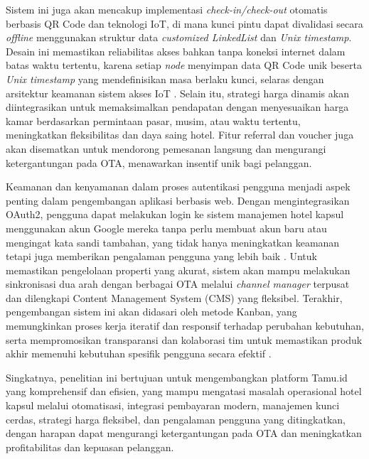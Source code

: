 Sistem ini juga akan mencakup implementasi \textit{check-in/check-out} otomatis berbasis QR Code dan teknologi IoT, di mana kunci pintu dapat divalidasi secara \textit{offline} menggunakan struktur data \textit{customized LinkedList} dan \textit{Unix timestamp}. Desain ini memastikan reliabilitas akses bahkan tanpa koneksi internet dalam batas waktu tertentu, karena setiap \textit{node} menyimpan data QR Code unik beserta \textit{Unix timestamp} yang mendefinisikan masa berlaku kunci, selaras dengan arsitektur keamanan sistem akses IoT \cite{alturjman2021}. Selain itu, strategi harga dinamis akan diintegrasikan untuk memaksimalkan pendapatan dengan menyesuaikan harga kamar berdasarkan permintaan pasar, musim, atau waktu tertentu, meningkatkan fleksibilitas dan daya saing hotel. Fitur referral dan voucher juga akan disematkan untuk mendorong pemesanan langsung dan mengurangi ketergantungan pada OTA, menawarkan insentif unik bagi pelanggan.

Keamanan dan kenyamanan dalam proses autentikasi pengguna menjadi aspek penting dalam pengembangan aplikasi berbasis web. Dengan mengintegrasikan OAuth2, pengguna dapat melakukan login ke sistem manajemen hotel kapsul menggunakan akun Google mereka tanpa perlu membuat akun baru atau mengingat kata sandi tambahan, yang tidak hanya meningkatkan keamanan tetapi juga memberikan pengalaman pengguna yang lebih baik \cite{oauthmic}. Untuk memastikan pengelolaan properti yang akurat, sistem akan mampu melakukan sinkronisasi dua arah dengan berbagai OTA melalui \textit{channel manager} terpusat dan dilengkapi Content Management System (CMS) yang fleksibel. Terakhir, pengembangan sistem ini akan didasari oleh metode Kanban, yang memungkinkan proses kerja iteratif dan responsif terhadap perubahan kebutuhan, serta mempromosikan transparansi dan kolaborasi tim untuk memastikan produk akhir memenuhi kebutuhan spesifik pengguna secara efektif \cite{anderson2010}.

Singkatnya, penelitian ini bertujuan untuk mengembangkan platform Tamu.id yang komprehensif dan efisien, yang mampu mengatasi masalah operasional hotel kapsul melalui otomatisasi, integrasi pembayaran modern, manajemen kunci cerdas, strategi harga fleksibel, dan pengalaman pengguna yang ditingkatkan, dengan harapan dapat mengurangi ketergantungan pada OTA dan meningkatkan profitabilitas dan kepuasan pelanggan.